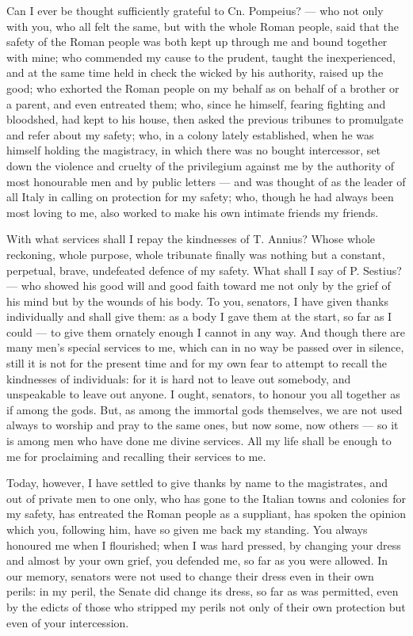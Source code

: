  Can I ever be thought sufficiently grateful to Cn. Pompeius? --- who not only with you, who all felt the same, but with the whole Roman people, said that the safety of the Roman people was both kept up through me and bound together with mine; who commended my cause to the prudent, taught the inexperienced, and at the same time held in check the wicked by his authority, raised up the good; who exhorted the Roman people on my behalf as on behalf of a brother or a parent, and even entreated them; who, since he himself, fearing fighting and bloodshed, had kept to his house, then asked the previous tribunes to promulgate and refer about my safety; who, in a colony lately established, when he was himself holding the magistracy, in which there was no bought intercessor, set down the violence and cruelty of the privilegium against me by the authority of most honourable men and by public letters --- and was thought of as the leader of all Italy in calling on protection for my safety; who, though he had always been most loving to me, also worked to make his own intimate friends my friends.

 With what services shall I repay the kindnesses of T. Annius? Whose whole reckoning, whole purpose, whole tribunate finally was nothing but a constant, perpetual, brave, undefeated defence of my safety. What shall I say of P. Sestius? --- who showed his good will and good faith toward me not only by the grief of his mind but by the wounds of his body. To you, senators, I have given thanks individually and shall give them: as a body I gave them at the start, so far as I could --- to give them ornately enough I cannot in any way. And though there are many men's special services to me, which can in no way be passed over in silence, still it is not for the present time and for my own fear to attempt to recall the kindnesses of individuals: for it is hard not to leave out somebody, and unspeakable to leave out anyone. I ought, senators, to honour you all together as if among the gods. But, as among the immortal gods themselves, we are not used always to worship and pray to the same ones, but now some, now others --- so it is among men who have done me divine services. All my life shall be enough to me for proclaiming and recalling their services to me.

 Today, however, I have settled to give thanks by name to the magistrates, and out of private men to one only, who has gone to the Italian towns and colonies for my safety, has entreated the Roman people as a suppliant, has spoken the opinion which you, following him, have so given me back my standing. You always honoured me when I flourished; when I was hard pressed, by changing your dress and almost by your own grief, you defended me, so far as you were allowed. In our memory, senators were not used to change their dress even in their own perils: in my peril, the Senate did change its dress, so far as was permitted, even by the edicts of those who stripped my perils not only of their own protection but even of your intercession.

